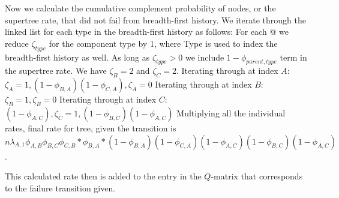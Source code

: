 \documentclass{article}
\begin{document}
Now we calculate the cumulative complement probability of nodes, or the supertree rate, that did not fail from breadth-first history.
We iterate through the linked list for each type in the breadth-first history as follows:
For each @ we reduce  $\zeta_{type}$ for the component type by 1, where Type is used to index the breadth-first history as well. As long as  $\zeta_{type} > 0$ we include $1 - \phi_{parent, type}$ term in the supertree rate. We have  $\zeta_{B} = 2$ and  $\zeta_{C}= 2$.
Iterating through at index $A$: $\zeta_{A} = 1, (1 - \phi_{B, A}) (1 - \phi_{C, A}), \zeta_{A} = 0$
Iterating through at index $B$: $\zeta_{B} = 1, \zeta_{B} = 0$
Iterating through at index $C$: $ (1 - \phi_{A, C}), \zeta_{C} = 1, (1 - \phi_{B, C}) (1 - \phi_{A, C}) $
Multiplying all the individual rates, final rate for tree, given the transition is $ n \lambda_{A, 1} \phi_{A, B} \phi_{B, C} \phi_{C, B} * \phi_{B, A} * (1 - \phi_{B, A}) (1 - \phi_{C, A}) (1 - \phi_{A, C}) (1 - \phi_{B, C}) (1 - \phi_{A, C}) $.

This calculated rate then is added to the entry in the $Q$-matrix that corresponds to the failure transition given.
\end{document}
